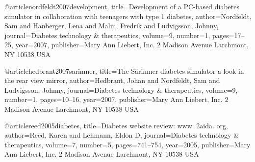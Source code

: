 
@article{nordfeldt2007development,
  title={Development of a PC-based diabetes simulator in collaboration with teenagers with type 1 diabetes},
  author={Nordfeldt, Sam and Hanberger, Lena and Malm, Fredrik and Ludvigsson, Johnny},
  journal={Diabetes technology \& therapeutics},
  volume={9},
  number={1},
  pages={17--25},
  year={2007},
  publisher={Mary Ann Liebert, Inc. 2 Madison Avenue Larchmont, NY 10538 USA}
}


@article{hedbrant2007sarimner,
  title={The S{\"a}rimner diabetes simulator-a look in the rear view mirror},
  author={Hedbrant, Johan and Nordfeldt, Sam and Ludvigsson, Johnny},
  journal={Diabetes technology \& therapeutics},
  volume={9},
  number={1},
  pages={10--16},
  year={2007},
  publisher={Mary Ann Liebert, Inc. 2 Madison Avenue Larchmont, NY 10538 USA}
}




@article{reed2005diabetes,
  title={Diabetes website review: www. 2aida. org},
  author={Reed, Karen and Lehmann, Eldon D},
  journal={Diabetes technology \& therapeutics},
  volume={7},
  number={5},
  pages={741--754},
  year={2005},
  publisher={Mary Ann Liebert, Inc. 2 Madison Avenue Larchmont, NY 10538 USA}
}